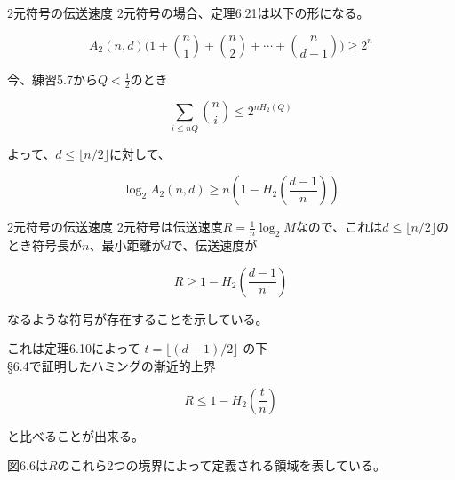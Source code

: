 \documentclass[dvipdfmx,10pt,jsarticle]{beamer}
\begin{document}
  \begin{frame}{2元符号の伝送速度}
      2元符号の場合、定理6.21は以下の形になる。

      \[ A_2(n, d) \big( 1 + \binom n1 + \binom n2 + \cdots + \binom{n}{d - 1} \big) \geq 2^n \]

      今、練習5.7から$Q < \frac 12$のとき

      \[ \underset{i \leq nQ}{\sum} \binom ni \leq 2^{nH_2 (Q)} \]

      よって、$d \leq \lfloor n / 2 \rfloor$に対して、

      \[ \log_2 A_2(n, d) \geq n(1 - H_2 (\frac{d - 1}{n})) \]
  \end{frame}

  \begin{frame}{2元符号の伝送速度}
      2元符号は伝送速度$R = \frac 1n \log_2 M$なので、これは$d \leq \lfloor n / 2 \rfloor$のとき符号長が$n$、最小距離が$d$で、伝送速度が

      \[ R \geq 1 - H_2 ( \frac{d - 1}{n}) \]

      なるような符号が存在することを示している。

      これは定理6.10によって $t = \lfloor (d - 1) / 2 \rfloor$ の下 \\ \S 6.4で証明したハミングの漸近的上界

      \[ R \leq 1 - H_2 (\frac tn ) \]

      と比べることが出来る。

      図6.6は$R$のこれら2つの境界によって定義される領域を表している。
  \end{frame}
\end{document}
